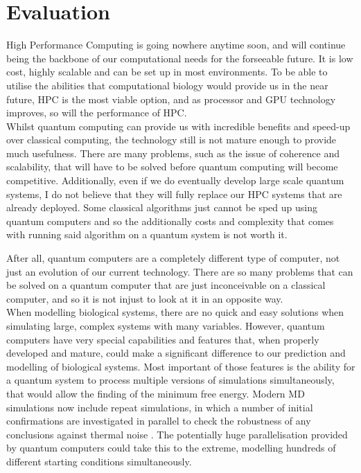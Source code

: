 {}
\section*{Evaluation}

High Performance Computing is going nowhere anytime soon, and will continue being the backbone of our computational needs for the forseeable future. It is low cost, highly scalable and can be set up in most environments. To be able to utilise the abilities that computational biology would provide us in the near future, HPC is the most viable option, and as processor and GPU technology improves, so will the performance of HPC. \\

\noindent
Whilst quantum computing can provide us with incredible benefits and speed-up over classical 
computing, the technology still is not mature enough to provide much usefulness. There are many problems, such as the issue of coherence and scalability, that will have to be solved before quantum computing will become competitive. Additionally, even if we do eventually develop large scale quantum systems, I do not believe that they will fully replace our HPC systems that are already deployed. Some classical algorithms just cannot be sped up using quantum computers and so the additionally costs and complexity that comes with running said algorithm on a quantum system is not worth it. 

After all, quantum computers are a completely different type of computer, not just an evolution of our current technology. There are so many problems that can be solved on a quantum computer that are just inconceivable on a classical computer, and so it is not injust to look at it in an opposite way.  \\ 

\noindent
When modelling biological systems, there are no quick and easy solutions when simulating large, complex systems with many variables. However, quantum computers have very special capabilities and features that, when properly developed and mature, could make a significant difference to our prediction and modelling of biological systems. Most important of those features is the ability for a quantum system to process multiple versions of simulations simultaneously, that would allow the finding of the minimum free energy. Modern MD simulations now include repeat simulations, in which a number of initial confirmations are investigated in parallel to check the robustness of any conclusions against thermal noise \cite{Quantum-assisted}. The potentially huge parallelisation provided by quantum computers could take this to the extreme, modelling hundreds of different starting conditions simultaneously. \\

